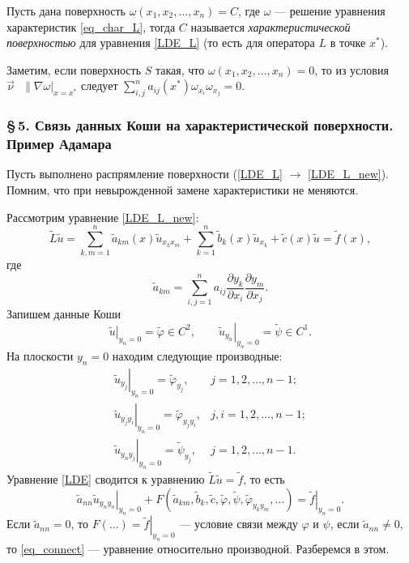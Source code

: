\documentclass[12pt,a5paper]{book}
\begin{document}
	Пусть дана поверхность $\omega(x_1,x_2,\dots,x_n) = C$, где $\omega$ --- решение уравнения характеристик \eqref{eq_char_L}, тогда $C$ называется \emph{характеристической поверхностью} для уравнения \eqref{LDE_L} (то есть для оператора $L$ в точке $x^*$).
	
	Заметим, если поверхность $S$ такая, что $\omega(x_1,x_2,\dots,x_n) = 0$, то из условия $\vec{\nu}\text{ }\| \nabla\omega|_{x=x^*}$ следует $\sum_{i,j}^{n}a_{ij}(x^*)\omega_{x_i}\omega_{x_j} = 0$.
	
	\subsubsection*{\S\,5. Связь данных Коши на характеристической поверхности. Пример Адамара}
	
	Пусть выполнено распрямление поверхности (\eqref{LDE_L} $\rightarrow$ \eqref{LDE_L_new}). Помним, что при невырожденной замене характеристики не меняются.
	
	Рассмотрим уравнение \eqref{LDE_L_new}:
	\begin{equation*}
		\tilde{L}\tilde{u} = \sum_{k,m=1}^{n}\tilde{a}_{km}(x)\tilde{u}_{x_kx_m} + \sum_{k=1}^{n}\tilde{b}_k(x)\tilde{u}_{x_k} + \tilde{c}(x)\tilde{u} = \tilde{f}(x),
	\end{equation*}
	где
	\begin{equation*}
		\tilde{a}_{km} = \sum_{i,j=1}^{n}a_{ij}\frac{\partial y_k}{\partial x_i}\frac{\partial y_m}{\partial x_j}.
	\end{equation*}
	Запишем данные Коши
	\begin{equation*}
		\left.\tilde{u}\right|_{y_n=0} = \tilde{\varphi} \in C^2, \qquad \left.\tilde{u}_{y_n}\right|_{y_n=0} = \tilde{\psi} \in C^1.
	\end{equation*}
	На плоскости $y_n = 0$ находим следующие производные:
	\begin{equation*}
		\begin{array}{ll}
			\left.\tilde{u}_{y_j}\right|_{y_n=0} = \tilde{\varphi}_{y_j}, & j = 1, 2, \dots, n-1; \\
			\left.\tilde{u}_{y_jy_i}\right|_{y_n=0} = \tilde{\varphi}_{y_jy_i}, & j,i = 1, 2, \dots, n-1; \\
			\left.\tilde{u}_{y_ny_j}\right|_{y_n=0} = \tilde{\psi}_{y_j}, & j = 1, 2, \dots, n-1.
		\end{array}
	\end{equation*}
	Уравнение \eqref{LDE} сводится к уравнению $\tilde{L}\tilde{u} = \tilde{f}$, то есть
	\begin{equation}\label{eq_connect}
		\left.\tilde{a}_{nn}\tilde{u}_{y_ny_n}\right|_{y_n=0} + F\left(\tilde{a}_{km}, \tilde{b}_k, \tilde{c}, \tilde{\varphi}, \tilde{\psi}, \tilde{\varphi}_{y_ky_m}, \dots\right) = \left.\tilde{f}\right|_{y_n=0}.
	\end{equation}
	Если $\tilde{a}_{nn} = 0$, то $F(\dots) = \left.\tilde{f}\right|_{y_n=0}$ --- условие связи между $\varphi$ и $\psi$, если $\tilde{a}_{nn} \neq 0$, то \eqref{eq_connect} --- уравнение относительно производной. Разберемся в этом.
	
\end{document}

